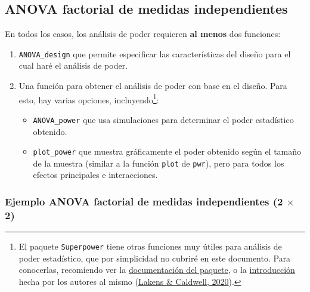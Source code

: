 \documentclass[
]{article}
\providecommand{\tightlist}{%
  \setlength{\itemsep}{0pt}\setlength{\parskip}{0pt}}
\begin{document}
\hypertarget{ind}{%
\subsection{ANOVA factorial de medidas independientes}\label{ind}}

En todos los casos, los análisis de poder requieren \textbf{al menos}
dos funciones:

\begin{enumerate}
\def\labelenumi{\arabic{enumi}.}
\item
  \texttt{ANOVA\_design} que permite especificar las características del
  diseño para el cual haré el análisis de poder.
\item
  Una función para obtener el análisis de poder con base en el diseño.
  Para esto, hay varias opciones, incluyendo\footnote{El paquete
    \texttt{Superpower} tiene otras funciones muy útiles para análisis
    de poder estadístico, que por simplicidad no cubriré en este
    documento. Para conocerlas, recomiendo ver la
    \href{https://www.rdocumentation.org/packages/Superpower/versions/0.0.3}{documentación
    del paquete}, o la
    \href{https://cran.r-project.org/web/packages/Superpower/vignettes/intro_to_superpower.html}{introducción}
    hecha por los autores al mismo
    (\protect\hyperlink{ref-lakensIntroductionSuperpower2020}{Lakens \&
    Caldwell, 2020}).}:

  \begin{itemize}
  \tightlist
  \item
    \texttt{ANOVA\_power} que usa simulaciones para determinar el poder
    estadístico obtenido.
  \item
    \texttt{plot\_power} que muestra gráficamente el poder obtenido
    según el tamaño de la muestra (similar a la función \texttt{plot} de
    \texttt{pwr}), pero para todos los efectos principales e
    interacciones.
  \end{itemize}
\end{enumerate}

\hypertarget{ejemplo-anova-factorial-de-medidas-independientes-2-times-2}{%
\subsubsection{\texorpdfstring{Ejemplo ANOVA factorial de medidas
independientes (2 \(\times\)
2)}{Ejemplo ANOVA factorial de medidas independientes (2 \textbackslash times 2)}}\label{ejemplo-anova-factorial-de-medidas-independientes-2-times-2}}
\end{document}
